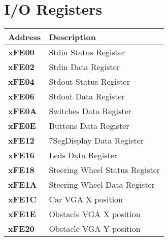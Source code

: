 \section{I/O Registers}
\begin{tabular}{| l | l |}
\hline
\textbf{Address}		& \textbf{Description}\\
\hline

\textbf{xFE00}			& Stdin Status Register\\
\textbf{xFE02}			& Stdin Data Register\\
\hline

\textbf{xFE04}			& Stdout Status Register\\
\textbf{xFE06}			& Stdout Data Register\\
\hline

\textbf{xFE0A}			& Switches Data Register\\
\textbf{xFE0E}			& Buttons Data Register\\
\textbf{xFE12}			& 7SegDisplay Data Register\\
\textbf{xFE16}			& Leds Data Register\\
\hline

\textbf{xFE18}			& Steering Wheel Status Register\\
\textbf{xFE1A}			& Steering Wheel Data Register\\
\hline

\textbf{xFE1C}			& Car VGA X position\\
\textbf{xFE1E}			& Obstacle VGA X position\\
\textbf{xFE20}			& Obstacle VGA Y position\\
\hline

\hline
\end{tabular}